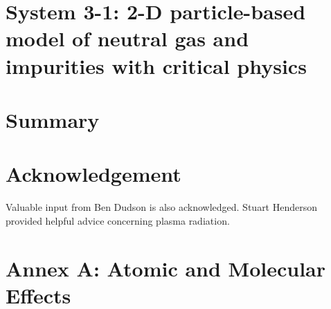 \documentclass[11pt,twoside,a4paper]{article}
\begin{document}
\section{System 3-1: 2-D particle-based model of neutral gas and impurities with critical physics} \label{sec:sys3-1}

%
%
%
%
%
\clearpage
\section{Summary}\label{sec:summ}

\section*{Acknowledgement}\label{sec:ackn}

Valuable input from Ben Dudson is also acknowledged. Stuart Henderson provided helpful
advice concerning plasma radiation.




\appendix
\section{Annex A: Atomic and Molecular Effects}\label{sec:atomic}

\end{document}
